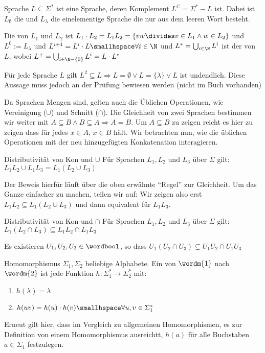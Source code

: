 \begin{definition}[]{Sprache}
    $L \subseteq \Sigma^*$ ist eine Sprache, deren Komplement $L^C = \Sigma^* - L$ ist. 
    Dabei ist $L_{\emptyset}$ die  und $L_{\lambda}$ die einelementige Sprache die nur aus dem leeren Wort besteht.

    Die  von $L_1$ und $L_2$ ist $L_1 \cdot L_2 = L_1 L_2 = \{ vw \divides v \in L_1 \land w \in L_2 \}$ und $L^0 := L_{\lambda}$ und $L^{i + 1} = L^i \cdot L \smallhspace \forall i \in \N$ und $L^* = \bigcup_{i \in \N} L^{i}$ ist der  von $L$, wobei $L^+ = \bigcup_{i \in \N - \{0\}} L^i = L \cdot L^*$
\end{definition}

Für jede Sprache $L$ gilt $L^2 \subseteq L \Longrightarrow L = \emptyset \lor L = \{ \lambda \} \lor L$ ist undendlich. 
Diese Aussage muss jedoch an der Prüfung bewiesen werden (nicht im Buch vorhanden)

Da Sprachen Mengen sind, gelten auch die Üblichen Operationen, wie Vereinigung ($\cup$) und Schnitt ($\cap$).
Die Gleichheit von zwei Sprachen bestimmen wir weiter mit $A \subseteq B \land B \subseteq A \Rightarrow A = B$.
Um $A \subseteq B$ zu zeigen reicht es hier zu zeigen dass für jedes $x \in A$, $x \in B$ hält.
Wir betrachten nun, wie die üblichen Operationen mit der neu hinzugefügten Konkatenation interagieren.

\begin{lemma}[]{Distributivität von Kon und $\cup$}
    Für Sprachen $L_1, L_2$ und $L_3$ über $\Sigma$ gilt: $L_1 L_2 \cup L_1 L_3 = L_1 (L_2 \cup L_3)$
\end{lemma}

Der Beweis hierfür läuft über die oben erwähnte ``Regel'' zur Gleichheit. 
Um das Ganze einfacher zu machen, teilen wir auf: Wir zeigen also erst $L_1 L_2 \subseteq L_1(L_2 \cup L_3)$ und dann equivalent für $L_1 L_3$.


\begin{lemma}[]{Distributivität von Kon und $\cap$}
    Für Sprachen $L_1, L_2$ und $L_3$ über $\Sigma$ gilt: $L_1 (L_2 \cap L_3) \subseteq L_1 L_2 \cap L_1 L_3$
\end{lemma}

\shortlemma Es existieren $U_1, U_2, U_3 \in \wordbool$, so dass $U_1 (U_2 \cap U_3) \subsetneq U_1 U_2 \cap U_1 U_3$



\begin{definition}[]{Homomorphismus}
    $\Sigma_1, \Sigma_2$ beliebige Alphabete. Ein  von $\wordm{1}$ nach $\wordm{2}$ ist jede Funktion $h: \Sigma_1^* \rightarrow \Sigma_2^*$ mit:
    \begin{enumerate}[label=\textit{(\roman*)}]
        \item $h(\lambda) = \lambda$
        \item $h(uv) = h(u) \cdot h(v) \smallhspace \forall u, v \in \Sigma_1^*$
    \end{enumerate}
\end{definition}

Erneut gilt hier, dass im Vergleich zu allgemeinen Homomorphismen, es zur Definition von einem Homomorphismus ausreichtt, $h(a)$ für alle Buchstaben $a \in \Sigma_1$ festzulegen.
